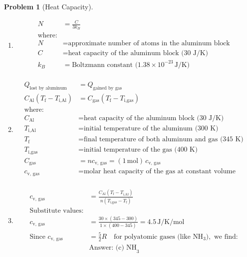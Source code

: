 \documentclass[12pt]{article}
\theoremstyle{definition} %
\newtheorem{problem}{Problem}
\theoremstyle{plain} %
\begin{document}
\begin{problem}[Heat Capacity]
    \noindent 
    \begin{enumerate}
        \item \begin{align*}
        N &= \frac{C}{3k_B} \\
        \text{where:} \\
        N &= \text{approximate number of atoms in the aluminum block} \\
        C &= \text{heat capacity of the aluminum block (30 J/K)} \\
        k_B &= \text{Boltzmann constant (} 1.38 \times 10^{-23} \, \text{J/K)} \\
        \end{align*}
        \item \begin{align*}
        Q_{\text{lost by aluminum}} &= Q_{\text{gained by gas}} \\
        C_{\text{Al}} (T_{\text{f}} - T_{\text{i,Al}}) &= C_{\text{gas}} (T_{\text{f}} - T_{\text{i,gas}}) \\
        \text{where:} \\
        C_{\text{Al}} &= \text{heat capacity of the aluminum block (30 J/K)} \\
        T_{\text{i,Al}} &= \text{initial temperature of the aluminum (300 K)} \\
        T_{\text{f}} &= \text{final temperature of both aluminum and gas (345 K)} \\
        T_{\text{i,gas}} &= \text{initial temperature of the gas (400 K)} \\
        C_{\text{gas}} &= n c_{\text{v, gas}} = (1 \, \text{mol}) \, c_{\text{v, gas}} \\
        c_{\text{v, gas}} &= \text{molar heat capacity of the gas at constant volume} \\
        \end{align*}
        \item \begin{align*}
        c_{\text{v, gas}} &= \frac{C_{\text{Al}} (T_{\text{f}} - T_{\text{i,Al}})}{n (T_{\text{i,gas}} - T_{\text{f}})} \\
        \text{Substitute values:} \\
        c_{\text{v, gas}} &= \frac{30 \times (345 - 300)}{1 \times (400 - 345)} = 4.5 \, \text{J/K/mol} \\
        \text{Since } c_{\text{v, gas}} &= \frac{5}{2} R \quad \text{for polyatomic gases (like } \text{NH}_3), \text{ we find:} \\
        &\text{Answer: (c) NH}_3
        \end{align*}
    \end{enumerate}
\end{problem}
\end{document}
